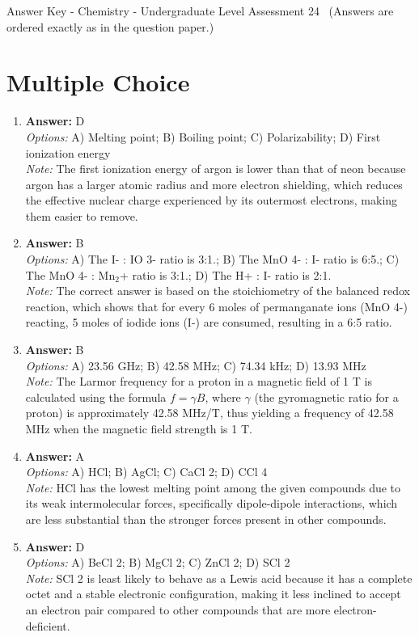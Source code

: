 \documentclass[12pt]{article}
\begin{document}
\begin{center}
Answer Key - Chemistry - Undergraduate Level Assessment 24 \
\small (Answers are ordered exactly as in the question paper.)
\end{center}

\section*{Multiple Choice}
\begin{enumerate}[label=\arabic*.]
\item \textbf{Answer:} D
\\ \textit{Options:} A) Melting point; B) Boiling point; C) Polarizability; D) First ionization energy
\\ \textit{Note:} The first ionization energy of argon is lower than that of neon because argon has a larger atomic radius and more electron shielding, which reduces the effective nuclear charge experienced by its outermost electrons, making them easier to remove.
\item \textbf{Answer:} B
\\ \textit{Options:} A) The I- : IO 3- ratio is 3:1.; B) The MnO 4- : I- ratio is 6:5.; C) The MnO 4- : Mn$_{2}$+ ratio is 3:1.; D) The H+ : I- ratio is 2:1.
\\ \textit{Note:} The correct answer is based on the stoichiometry of the balanced redox reaction, which shows that for every 6 moles of permanganate ions (MnO 4-) reacting, 5 moles of iodide ions (I-) are consumed, resulting in a 6:5 ratio.
\item \textbf{Answer:} B
\\ \textit{Options:} A) 23.56 GHz; B) 42.58 MHz; C) 74.34 kHz; D) 13.93 MHz
\\ \textit{Note:} The Larmor frequency for a proton in a magnetic field of 1 T is calculated using the formula \( f = \gamma B \), where \( \gamma \) (the gyromagnetic ratio for a proton) is approximately 42.58 MHz/T, thus yielding a frequency of 42.58 MHz when the magnetic field strength is 1 T.
\item \textbf{Answer:} A
\\ \textit{Options:} A) HCl; B) AgCl; C) CaCl 2; D) CCl 4
\\ \textit{Note:} HCl has the lowest melting point among the given compounds due to its weak intermolecular forces, specifically dipole-dipole interactions, which are less substantial than the stronger forces present in other compounds.
\item \textbf{Answer:} D
\\ \textit{Options:} A) BeCl 2; B) MgCl 2; C) ZnCl 2; D) SCl 2
\\ \textit{Note:} SCl 2 is least likely to behave as a Lewis acid because it has a complete octet and a stable electronic configuration, making it less inclined to accept an electron pair compared to other compounds that are more electron-deficient.
\end{enumerate}
\end{document}

